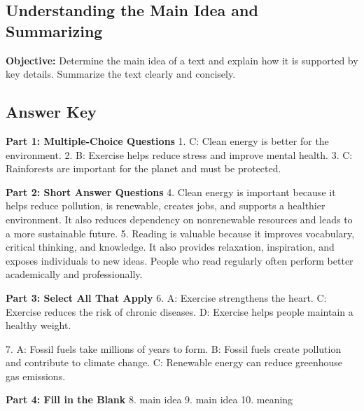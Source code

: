 \documentclass[12pt]{article}
\begin{document}
\subsection*{Understanding the Main Idea and Summarizing}
\onehalfspacing

\begin{tcolorbox}[colframe=black!40, colback=gray!0, title=Learning Objective]
\textbf{Objective:} Determine the main idea of a text and explain how it is supported by key details. Summarize the text clearly and concisely.
\end{tcolorbox}

\subsection*{Answer Key}

\textbf{Part 1: Multiple-Choice Questions}
1. C: Clean energy is better for the environment.  
2. B: Exercise helps reduce stress and improve mental health.  
3. C: Rainforests are important for the planet and must be protected.  

\textbf{Part 2: Short Answer Questions}  
4. Clean energy is important because it helps reduce pollution, is renewable, creates jobs, and supports a healthier environment. It also reduces dependency on nonrenewable resources and leads to a more sustainable future.  
5. Reading is valuable because it improves vocabulary, critical thinking, and knowledge. It also provides relaxation, inspiration, and exposes individuals to new ideas. People who read regularly often perform better academically and professionally.  

\textbf{Part 3: Select All That Apply}  
6. A: Exercise strengthens the heart.  
   C: Exercise reduces the risk of chronic diseases.  
   D: Exercise helps people maintain a healthy weight.  

7. A: Fossil fuels take millions of years to form.  
   B: Fossil fuels create pollution and contribute to climate change.  
   C: Renewable energy can reduce greenhouse gas emissions.  

\textbf{Part 4: Fill in the Blank}  
8. main idea  
9. main idea  
10. meaning  
\end{document}
